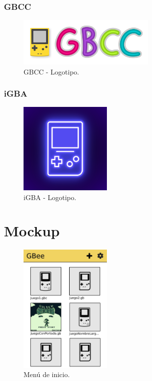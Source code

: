 \subsubsection{GBCC}

\begin{figure}[H]
    \centering
    \includegraphics[width=0.6\textwidth]{include/images/gbcclogo.png}
    \caption{GBCC - Logotipo.}
    \label{figure:gbcclogo}
\end{figure}

\subsubsection{iGBA}

\begin{figure}[H]
    \centering
    \includegraphics[width=0.4\textwidth]{include/images/igbalogo.png}
    \caption{iGBA - Logotipo.}
    \label{figure:igbalogo}
\end{figure}

\section{Mockup}

\begin{figure}[H]
    \centering
    \includegraphics[width=0.4\textwidth]{include/images/mockup_menu.jpg}
    \caption{Menú de inicio.}
    \label{figure:mockupmenu}
\end{figure}

